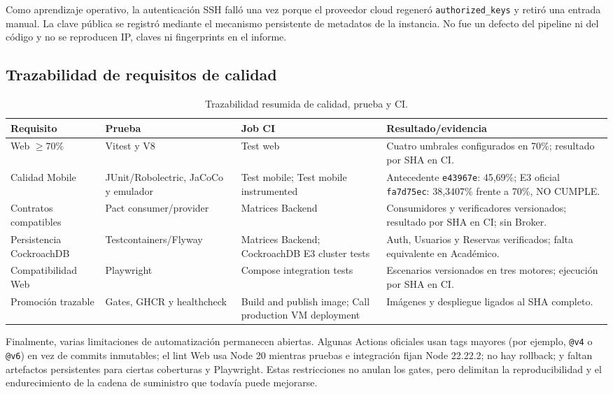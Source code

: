 Como aprendizaje operativo, la autenticación SSH falló una vez porque el
proveedor cloud regeneró \texttt{authorized\_keys} y retiró una entrada manual.
La clave pública se registró mediante el mecanismo persistente de metadatos de la
instancia. No fue un defecto del pipeline ni del código y no se reproducen IP,
claves ni fingerprints en el informe.

\subsection{Trazabilidad de requisitos de calidad}
\label{subsec:trazabilidad-pruebas}

\begin{table}[ht]
  \centering
  \small
  \caption{Trazabilidad resumida de calidad, prueba y CI.}
  \label{tab:trazabilidad-pruebas}
  \begin{tabular}{|p{3.1cm}|p{3.1cm}|p{3.2cm}|p{4.0cm}|}
    \hline
    \textbf{Requisito} & \textbf{Prueba} & \textbf{Job CI} & \textbf{Resultado/evidencia} \\
    \hline
    Web $\geq 70\%$ & Vitest y V8 & Test web & Cuatro umbrales configurados en 70\%; resultado por SHA en CI. \\
    \hline
    Calidad Mobile & JUnit/Robolectric, JaCoCo y emulador & Test mobile; Test mobile instrumented & Antecedente \texttt{e43967e}: 45,69\%; E3 oficial \texttt{fa7d75ec}: 38,3407\% frente a 70\%, NO CUMPLE. \\
    \hline
    Contratos compatibles & Pact consumer/provider & Matrices Backend & Consumidores y verificadores versionados; resultado por SHA en CI; sin Broker. \\
    \hline
    Persistencia CockroachDB & Testcontainers/Flyway & Matrices Backend; CockroachDB E3 cluster tests & Auth, Usuarios y Reservas verificados; falta equivalente en Académico. \\
    \hline
    Compatibilidad Web & Playwright & Compose integration tests & Escenarios versionados en tres motores; ejecución por SHA en CI. \\
    \hline
    Promoción trazable & Gates, GHCR y healthcheck & Build and publish image; Call production VM deployment & Imágenes y despliegue ligados al SHA completo. \\
    \hline
  \end{tabular}
\end{table}

Finalmente, varias limitaciones de automatización permanecen abiertas. Algunas
Actions oficiales usan tags mayores (por ejemplo, \texttt{@v4} o \texttt{@v6})
en vez de commits inmutables; el lint Web usa Node 20 mientras pruebas e
integración fijan Node 22.22.2; no hay rollback; y faltan artefactos persistentes
para ciertas coberturas y Playwright. Estas restricciones no anulan los gates,
pero delimitan la reproducibilidad y el endurecimiento de la cadena de
suministro que todavía puede mejorarse.
